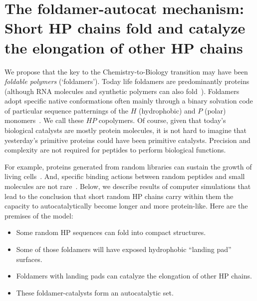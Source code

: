 \documentclass[5p,times]{elsarticle}
\begin{document}
\section{The foldamer-autocat mechanism: Short HP chains fold and catalyze the elongation of other 
HP chains}

 We propose that the key to the Chemistry-to-Biology transition may have been \emph{foldable 
polymers} (`foldamers').  Today life foldamers are predominantly proteins (although RNA molecules 
and synthetic polymers can also fold~\cite{Gellman1998,Lee2005a,Capriotti2008}). Foldamers 
adopt specific native conformations often mainly through a binary solvation code of particular 
sequence patternings of the $H$ (hydrophobic) and $P$ (polar) monomers~\cite{Chan1991}.  We call 
these $HP$ copolymers.  Of course, given that today's biological catalysts are mostly protein 
molecules, it is not hard to imagine that yesterday's primitive proteins could have been primitive 
catalysts.  Precision and complexity are not required for peptides to perform biological functions. 
 
For example, proteins generated from random libraries can sustain the growth of living 
cells~\cite{Fisher2011}.  And, specific binding actions between random peptides and small molecules 
are not rare~\cite{Cherny2012}.  Below, we describe results of computer simulations that lead to 
the conclusion that short random HP chains carry within them the capacity to autocatalytically 
become longer and more protein-like.  Here are the premises of the model:
 
 \begin{itemize}
 \item Some random HP sequences can fold into compact structures.
 \item Some of those foldamers will have exposed hydrophobic ``landing pad'' surfaces.
 \item Foldamers with landing pads can catalyze the elongation of other HP chains.
 \item These foldamer-catalysts form an autocatalytic set.
\end{itemize}
\end{document}

